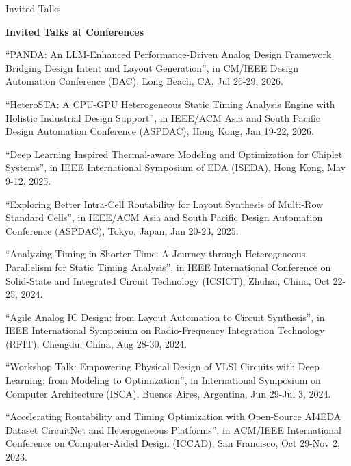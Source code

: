 \begin{rSection}{Invited Talks}

\textbf{Invited Talks at Conferences}
        
\begin{description}[font=\normalfont]

\item[{[15]}]{
``PANDA: An LLM-Enhanced Performance-Driven Analog Design Framework Bridging Design Intent and Layout Generation'', in CM/IEEE Design Automation Conference (DAC), Long Beach, CA, Jul 26-29, 2026.
}

\item[{[14]}]{
``HeteroSTA: A CPU-GPU Heterogeneous Static Timing Analysis Engine with Holistic Industrial Design Support'', in IEEE/ACM Asia and South Pacific Design Automation Conference (ASPDAC), Hong Kong, Jan 19-22, 2026.
}

\item[{[13]}]{
``Deep Learning Inspired Thermal-aware Modeling and Optimization for Chiplet Systems'', in IEEE International Symposium of EDA (ISEDA), Hong Kong, May 9-12, 2025. 
}

\item[{[12]}]{
``Exploring Better Intra-Cell Routability for Layout Synthesis of Multi-Row Standard Cells'', in IEEE/ACM Asia and South Pacific Design Automation Conference (ASPDAC), Tokyo, Japan, Jan 20-23, 2025. 
}

\item[{[11]}]{
``Analyzing Timing in Shorter Time: A Journey through Heterogeneous Parallelism for Static Timing Analysis'', in IEEE International Conference on Solid-State and Integrated Circuit Technology (ICSICT), Zhuhai, China, Oct 22-25, 2024. 
}

\item[{[10]}]{
``Agile Analog IC Design: from Layout Automation to Circuit Synthesis'', in IEEE International Symposium on Radio-Frequency Integration Technology (RFIT), Chengdu, China, Aug 28-30, 2024. 
}

\item[{[9]}]{
``Workshop Talk: Empowering Physical Design of VLSI Circuits with Deep Learning: from Modeling to Optimization'', in International Symposium on Computer Architecture (ISCA), Buenos Aires, Argentina, Jun 29-Jul 3, 2024. 
}

\item[{[8]}]{
``Accelerating Routability and Timing Optimization with Open-Source AI4EDA Dataset CircuitNet and Heterogeneous Platforms'', in ACM/IEEE International Conference on Computer-Aided Design (ICCAD), San Francisco, Oct 29-Nov 2, 2023. 
}


\end{description}
\end{rSection}
